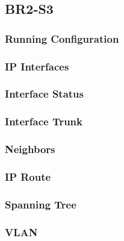 \subsection{BR2-S3}
\subsubsection{Running Configuration}


\subsubsection{IP Interfaces}


\subsubsection{Interface Status}


\subsubsection{Interface Trunk}


\subsubsection{Neighbors}


\subsubsection{IP Route}


\subsubsection{Spanning Tree}


\subsubsection{VLAN}





